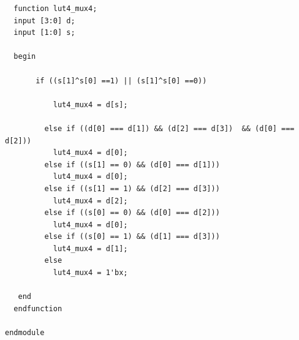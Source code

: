 \documentclass[a4paper,openright,12pt]{report}
\begin{document}
\begin{lstlisting}
  function lut4_mux4;
  input [3:0] d;
  input [1:0] s;
   
  begin

       if ((s[1]^s[0] ==1) || (s[1]^s[0] ==0))

           lut4_mux4 = d[s];

         else if ((d[0] === d[1]) && (d[2] === d[3])  && (d[0] === d[2]))
           lut4_mux4 = d[0];
         else if ((s[1] == 0) && (d[0] === d[1]))
           lut4_mux4 = d[0];
         else if ((s[1] == 1) && (d[2] === d[3]))
           lut4_mux4 = d[2];
         else if ((s[0] == 0) && (d[0] === d[2]))
           lut4_mux4 = d[0];
         else if ((s[0] == 1) && (d[1] === d[3]))
           lut4_mux4 = d[1];
         else
           lut4_mux4 = 1'bx;

   end
  endfunction

endmodule
\end{lstlisting}
\end{document}
